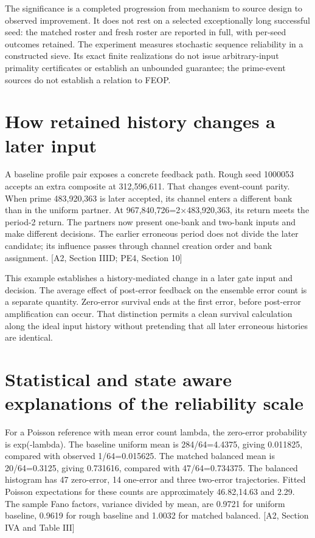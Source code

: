 The significance is a completed progression from mechanism to source design to observed improvement. It does not rest on a selected exceptionally long successful seed: the matched roster and fresh roster are reported in full, with per-seed outcomes retained. The experiment measures stochastic sequence reliability in a constructed sieve. Its exact finite realizations do not issue arbitrary-input primality certificates or establish an unbounded guarantee; the prime-event sources do not establish a relation to FEOP.

\section{How retained history changes a later input}\label{how-retained-history-changes-a-later-input}

A baseline profile pair exposes a concrete feedback path. Rough seed 1000053 accepts an extra composite at 312,596,611. That changes event-count parity. When prime 483,920,363 is later accepted, its channel enters a different bank than in the uniform partner. At 967,840,726=2×483,920,363, its return meets the period-2 return. The partners now present one-bank and two-bank inputs and make different decisions. The earlier erroneous period does not divide the later candidate; its influence passes through channel creation order and bank assignment. {[}A2, Section IIID; PE4, Section 10{]}

This example establishes a history-mediated change in a later gate input and decision. The average effect of post-error feedback on the ensemble error count is a separate quantity. Zero-error survival ends at the first error, before post-error amplification can occur. That distinction permits a clean survival calculation along the ideal input history without pretending that all later erroneous histories are identical.

\section{Statistical and state aware explanations of the reliability scale}\label{statistical-and-state-aware-explanations-of-the-reliability-scale}

For a Poisson reference with mean error count lambda, the zero-error probability is exp(-lambda). The baseline uniform mean is 284/64=4.4375, giving 0.011825, compared with observed 1/64=0.015625. The matched balanced mean is 20/64=0.3125, giving 0.731616, compared with 47/64=0.734375. The balanced histogram has 47 zero-error, 14 one-error and three two-error trajectories. Fitted Poisson expectations for these counts are approximately 46.82,14.63 and 2.29. The sample Fano factors, variance divided by mean, are 0.9721 for uniform baseline, 0.9619 for rough baseline and 1.0032 for matched balanced. {[}A2, Section IVA and Table III{]}

